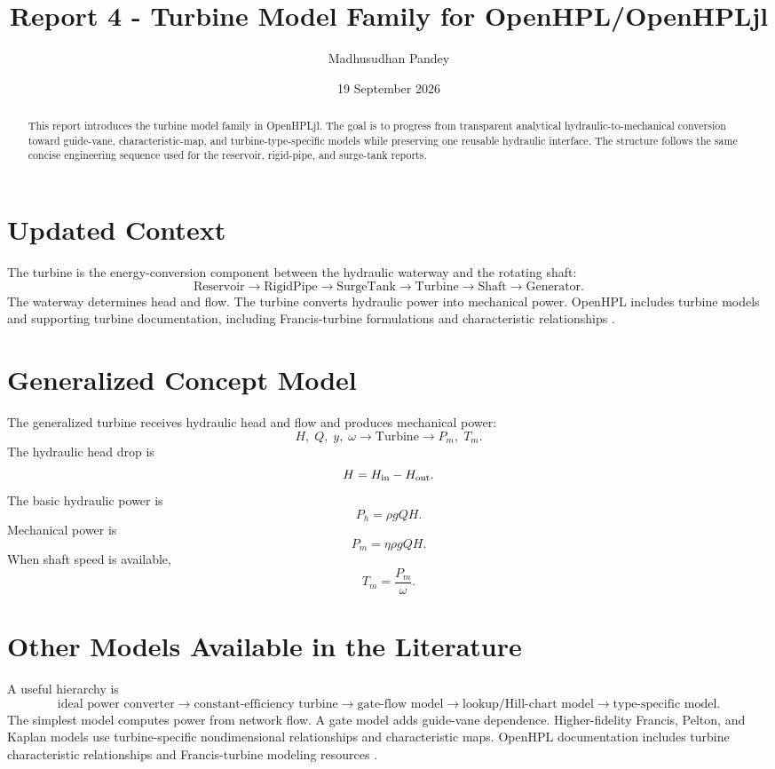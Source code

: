 \documentclass[11pt,a4paper]{article}
\title{Report 4 - Turbine Model Family for OpenHPL/OpenHPLjl}
\author{Madhusudhan Pandey}
\date{19 September 2026}
\begin{document}
\maketitle
\begin{abstract}
This report introduces the turbine model family in OpenHPLjl. The goal is to progress from transparent analytical hydraulic-to-mechanical conversion toward guide-vane, characteristic-map, and turbine-type-specific models while preserving one reusable hydraulic interface. The structure follows the same concise engineering sequence used for the reservoir, rigid-pipe, and surge-tank reports.
\end{abstract}

\section{Updated Context}
The turbine is the energy-conversion component between the hydraulic waterway and the rotating shaft:
\[
\boxed{\text{Reservoir}\rightarrow\text{RigidPipe}\rightarrow\text{SurgeTank}\rightarrow\text{Turbine}\rightarrow\text{Shaft}\rightarrow\text{Generator}}.
\]
The waterway determines head and flow. The turbine converts hydraulic power into mechanical power. OpenHPL includes turbine models and supporting turbine documentation, including Francis-turbine formulations and characteristic relationships \cite{Sharefi,OpenHPLTurbine}.

\section{Generalized Concept Model}
The generalized turbine receives hydraulic head and flow and produces mechanical power:
\[
\boxed{H,\;Q,\;y,\;\omega \rightarrow \text{Turbine} \rightarrow P_m,\;T_m}.
\]
The hydraulic head drop is
\[
H=H_{\rm in}-H_{\rm out}.
\]
The basic hydraulic power is
\[
P_h=\rho gQH.
\]
Mechanical power is
\[
\boxed{P_m=\eta \rho gQH}.
\]
When shaft speed is available,
\[
T_m=\frac{P_m}{\omega}.
\]

\section{Other Models Available in the Literature}
A useful hierarchy is
\[
\boxed{\text{ideal power converter}\rightarrow\text{constant-efficiency turbine}\rightarrow\text{gate-flow model}\rightarrow\text{lookup/Hill-chart model}\rightarrow\text{type-specific model}}.
\]
The simplest model computes power from network flow. A gate model adds guide-vane dependence. Higher-fidelity Francis, Pelton, and Kaplan models use turbine-specific nondimensional relationships and characteristic maps. OpenHPL documentation includes turbine characteristic relationships and Francis-turbine modeling resources \cite{Sharefi,OpenHPLTurbine}.
\end{document}
